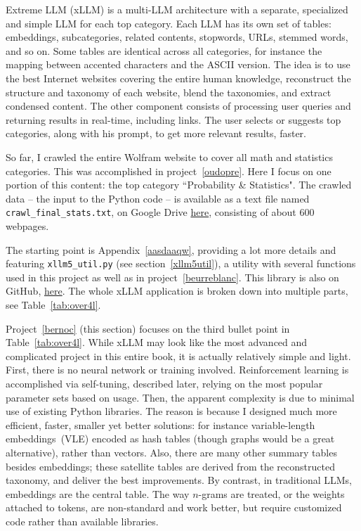 \documentclass[oneside,10pt]{book}
\begin{document}
Extreme LLM (\textcolor{index}{xLLM}) is a multi-LLM architecture with a separate, specialized and simple LLM for each top category.  Each LLM has its own set of tables:
 embeddings, subcategories, related contents, stopwords, URLs, stemmed words, and so on. Some tables are identical across all categories, 
 for instance the mapping between accented characters and the ASCII version.   The idea is to use the
 best Internet websites covering the entire human knowledge, reconstruct the structure and taxonomy of each website, blend the taxonomies, and extract
 condensed content. The other
  component consists of processing 
user queries and returning 
 results in real-time, including links. The user selects or suggests top categories, along with his prompt, to get more relevant results, faster. 

So far, I crawled the entire Wolfram website to cover all math and statistics categories. This was accomplished in project~\ref{oudopre}. Here I focus
 on one portion of this content: the top category ``Probability \& Statistics". The crawled data -- the input to the Python code --
 is available as a text file named \texttt{crawl\_final\_stats.txt}, on Google Drive \href{https://drive.google.com/file/d/1H_xhfhzIPnO8oe9xlwCDWWM9OR5m81wd/view}{here},
 consisting of about 600 webpages. 

The starting point is Appendix~\ref{aasdaaqw}, providing a lot more details and featuring 
\texttt{xllm5\_util.py} (see section~\ref{xllm5util}), a utility with several functions used in this project as well as in project~\ref{beurreblanc}. 
This library is also on GitHub, \href{https://github.com/VincentGranville/Large-Language-Models/blob/main/xllm5/xllm5_util.py}{here}. 
The whole xLLM application is broken down into multiple parts, see Table~\ref{tab:over4l}.

Project~\ref{bernoc} (this section) focuses on the third bullet point in Table~\ref{tab:over4l}. While xLLM may look like the most advanced and complicated project in
 this entire book, it is actually relatively simple and light. First, there is no neural network or training involved. Reinforcement learning is accomplished via
 self-tuning, described later, relying on the most popular parameter sets based on usage. Then, the apparent complexity is due to minimal use of existing
 Python libraries. The reason is because I designed much more efficient, faster, smaller yet better solutions: for instance 
 \textcolor{index}{variable-length embeddings}\ (VLE) encoded as hash tables (though graphs would be a great alternative), 
rather than vectors. Also, there are many other summary tables besides embeddings; these satellite tables are derived from the reconstructed taxonomy, and
 deliver the best improvements. By contrast, in traditional LLMs, embeddings are the central table. The way $n$-grams are treated, or the weights attached to tokens, are 
 non-standard and work better, but require customized code rather than available libraries.
\vspace{1ex}
\end{document}
